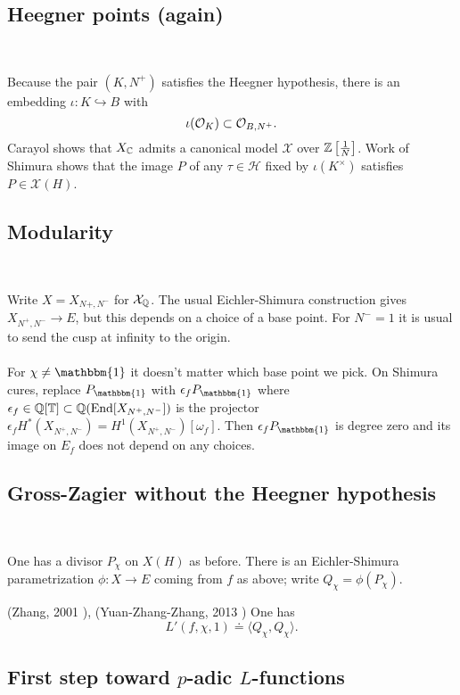 \documentclass[12pt,amsfont]{amsart}
\begin{document}
\subsection{Heegner points (again)}
{\ }


Because the pair $(K, N^+)$ satisfies the Heegner hypothesis, there is an embedding $\iota: K \hookrightarrow B$ with
\[\iota(\mathcal{O}_K) \subset \mathcal{O}_{B,N^+}.\]
Carayol shows that $X_{\mathbb C}$ admits a canonical model $\mathcal{X}$ over ${\mathbb Z}\left[\frac{1}{N}\right]$. Work of Shimura shows that the image $P$ of any $\tau \in \mathcal{H}$ fixed by $\iota(K^\times)$ satisfies $P \in \mathcal{X}(H)$.


\subsection{Modularity}
{\ }

Write $X = X_{N+, N^{-}}$ for $\mathcal{X}_{\mathbb Q}$. The usual Eichler-Shimura construction gives $X_{N^+, N^{-}} \rightarrow E$, but this depends on a choice of a base point. For $N^{-} = 1$ it is usual to send the cusp at infinity to the origin. \\ \\
For $\chi \ne \mathbbm{1}$ it doesn't matter which base point we pick. On Shimura cures, replace $P_{\mathbbm{1}}$ with $\epsilon_f P_{\mathbbm{1}}$ where $\epsilon_f \in {\mathbb Q}[\mathbb{T}] \subset {\mathbb Q}(\operatorname{End}[X_{N^+, N^{-}}])$ is the projector $\epsilon_f H^\ast(X_{N^+, N^{-}}) = H^1(X_{N^+, N^{-}})[\omega_f]$. Then $\epsilon_f P_{\mathbbm{1}}$ is degree zero and its image on $E_f$ does not depend on any choices. 


\subsection{Gross-Zagier without the Heegner hypothesis}
{\ }

One has a divisor $P_\chi$ on $X(H)$ as before. There is an Eichler-Shimura parametrization $\phi: X \rightarrow E$ coming from $f$ as above; write $Q_\chi = \phi(P_\chi)$. 
\begin{thm} (Zhang, 2001 ), (Yuan-Zhang-Zhang, 2013 ) One has
\[L'(f, \chi, 1) \doteq \langle Q_\chi, Q_\chi \rangle.\]
\end{thm} 


\subsection{First step toward $p$-adic $L$-functions}
{\ }
\end{document}
